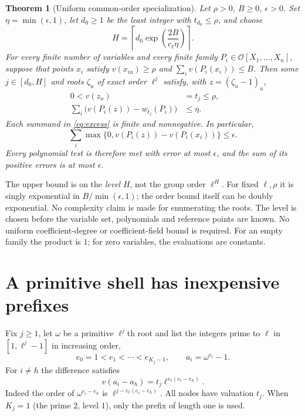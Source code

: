\documentclass[11pt]{article}
\newtheorem{theorem}{Theorem}[section]\newtheorem{lemma}[theorem]{Lemma}\newtheorem{corollary}[theorem]{Corollary}\newtheorem{remark}[theorem]{Remark}
\newcommand{\Ocal}{\mathcal O}\newcommand{\Qp}{\overline{\mathbb Q}_{\ell}}
\begin{document}
\begin{theorem}[Uniform common-order specialization]\label{thm:main}
Let $\rho>0$, $B\ge0$, $\epsilon>0$. Set $\eta=\min(\epsilon,1)$, let $d_0\ge1$ be the least integer with $t_{d_0}\le\rho$, and choose
\begin{equation}\label{eq:H}
 H=\left\lceil d_0\exp\left(\frac{2B}{c_\ell\eta}\right)\right\rceil.
\end{equation}
For every finite number of variables and every finite family $P_i\in\Ocal[X_1,\ldots,X_n]$, suppose that points $x_i$ satisfy $v(x_{iu})\ge\rho$ and $\sum_i v(P_i(x_i))\le B$. Then some $j\in[d_0,H]$ and roots $\zeta_u$ of exact order $\ell^j$ satisfy, with $z=(\zeta_u-1)_u$,
\begin{align}
 0<v(z_u)&=t_j\le\rho,\label{eq:rad}\qquad\\
 \sum_i\bigl(v(P_i(z))-w_{t_j}(P_i)\bigr)&\le\eta.\label{eq:excess}
\end{align}
Each summand in \eqref{eq:excess} is finite and nonnegative. In particular,
\[
 \sum_i\max\{0,v(P_i(z))-v(P_i(x_i))\}\le\epsilon.
\]
Every polynomial test is therefore met with error at most $\epsilon$, and the sum of its positive errors is at most $\epsilon$.
\end{theorem}

The upper bound is on the \emph{level} $H$, not the group order $\ell^H$. For fixed $\ell,\rho$ it is singly exponential in $B/\min(\epsilon,1)$; the order bound itself can be doubly exponential. No complexity claim is made for enumerating the roots. The level is chosen before the variable set, polynomials and reference points are known. No uniform coefficient-degree or coefficient-field bound is required. For an empty family the product is $1$; for zero variables, the evaluations are constants.

\section{A primitive shell has inexpensive prefixes}
Fix $j\ge1$, let $\omega$ be a primitive $\ell^j$th root and list the integers prime to $\ell$ in $[1,\ell^j-1]$ in increasing order,
\[
 e_0=1<e_1<\cdots<e_{K_j-1},\qquad a_i=\omega^{e_i}-1.
\]
For $i\ne h$ the difference satisfies
\begin{equation}\label{eq:distance}
 v(a_i-a_h)=t_j\ell^{v_\ell(e_i-e_h)}.
\end{equation}
Indeed the order of $\omega^{e_i-e_h}$ is $\ell^{j-v_\ell(e_i-e_h)}$. All nodes have valuation $t_j$. When $K_j=1$ (the prime $2$, level $1$), only the prefix of length one is used.
\end{document}
